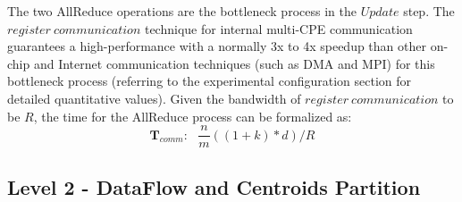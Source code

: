 The two AllReduce operations are the bottleneck process in the $Update$ step. The $register\ communication$ technique for internal multi-CPE communication guarantees a high-performance with a normally 3x to 4x speedup than other on-chip and Internet communication techniques (such as DMA and MPI) for this bottleneck process (referring to the experimental configuration section for detailed quantitative values). 
Given the bandwidth of $register\ communication$ to be $R$, the time for the AllReduce process can be formalized as:
$$\mathbf{T}_{comm}:\ \ \ \frac{n}{m}((1+k)*d)/R$$

\subsection{Level 2 - DataFlow and Centroids Partition}

